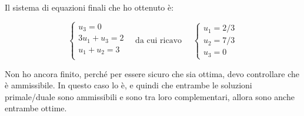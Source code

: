 Il sistema di equazioni finali che ho ottenuto è:

$$
\begin{cases}
u_3 = 0 \\
3u_1 + u_3 = 2 \\
u_1 + u_2 = 3 \\
\end{cases} \quad \text{da cui ricavo } \quad \begin{cases}
u_1 = 2/3 \\
u_2 = 7/3 \\
u_3 = 0
\end{cases}
$$

Non ho ancora finito, perché per essere sicuro che sia ottima, devo controllare che è ammissibile. In questo caso lo è, e quindi che entrambe le soluzioni primale/duale sono ammissibili e sono tra loro complementari, allora sono anche entrambe ottime.







